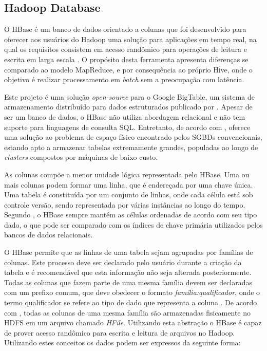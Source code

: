 \subsection{Hadoop Database}

O HBase é um banco de dados orientado a colunas que foi desenvolvido para oferecer aos usuários do Hadoop uma solução para aplicações em tempo real, na qual os requisitos consistem em acesso randômico para operações de leitura e escrita em larga escala \cite{white2012}. O propósito desta ferramenta apresenta diferenças se comparado ao modelo MapReduce, e por consequência ao próprio Hive, onde o objetivo é realizar processamento em \textit{batch} sem a preocupação com latência.

Este projeto é uma solução \textit{open-source} para o Google BigTable, um sistema de armazenamento distribuído para dados estruturados publicado por . Apesar de ser um banco de dados, o HBase não utiliza abordagem relacional e não tem suporte para linguagens de consulta SQL. Entretanto, de acordo com , oferece uma solução ao problema de espaço físico encontrado pelos SGBDs convencionais, estando apto a armazenar tabelas extremamente grandes, populadas ao longo de \textit{clusters} compostos por máquinas de baixo custo.

As colunas compõe a menor unidade lógica representada pelo HBase. Uma ou mais colunas podem formar uma linha, que é endereçada por uma chave única. Uma tabela é constituída por um conjunto de linhas, onde cada célula está sob controle versão, sendo representada por várias instâncias ao longo do tempo. Segundo , o HBase sempre mantém as células ordenadas de acordo com seu tipo dado, o que pode ser comparado com os índices de chave primária utilizados pelos bancos de dados relacionais.

O HBase permite que as linhas de uma tabela sejam agrupadas por famílias de colunas. Este processo deve ser declarado pelo usuário durante a criação da tabela e é recomendável que esta informação não seja alterada posteriormente. Todas as colunas que fazem parte de uma mesma família devem ser declaradas com um prefixo comum, que deve obedecer o formato \textit{família:qualificador}, onde o termo qualificador se refere ao tipo de dado que representa a coluna \cite{white2012}. De acordo com , todas as colunas de uma mesma família são armazenadas fisicamente no HDFS em um arquivo chamado \textit{HFile}. Utilizando esta abstração o HBase é capaz de prover acesso randômico para escrita e leitura de arquivos no Hadoop. Utilizando estes conceitos os dados podem ser expressos da seguinte forma:

